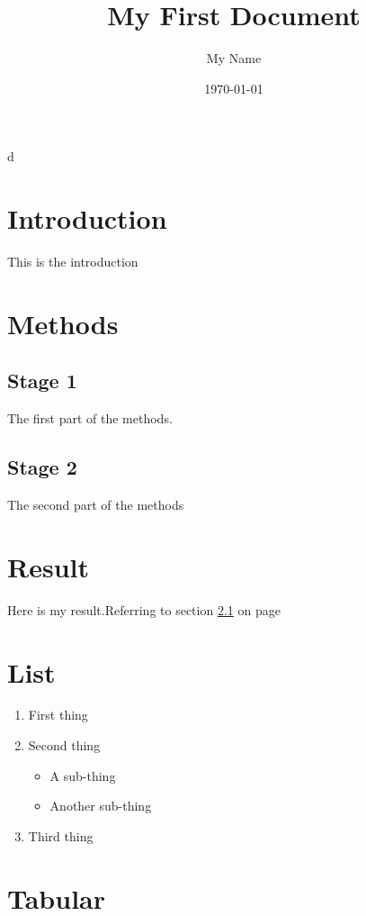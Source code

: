 \documentclass[a4paper,12pt]{article}
\begin{document}
	
\title{My First Document}d
\author{My Name}
\date{\today}
\maketitle
{}
\tableofcontents
\newpage

	
\section{Introduction}
This is the introduction

\section{Methods}

\subsection{Stage 1}
\label{sec1}
The first part of the methods.  


\subsection{Stage 2}
The second part of the methods\\ %


\section{Result}
Here is my result.Referring to section \ref{sec1} on page \pageref{sec1}
	
\section{List}
\begin{enumerate}
	\item First thing
	\item Second thing
	\begin{itemize}
		\item A sub-thing
		\item Another sub-thing
	\end{itemize}
	\item Third thing
\end{enumerate}

\section{Tabular}
\end{document}
